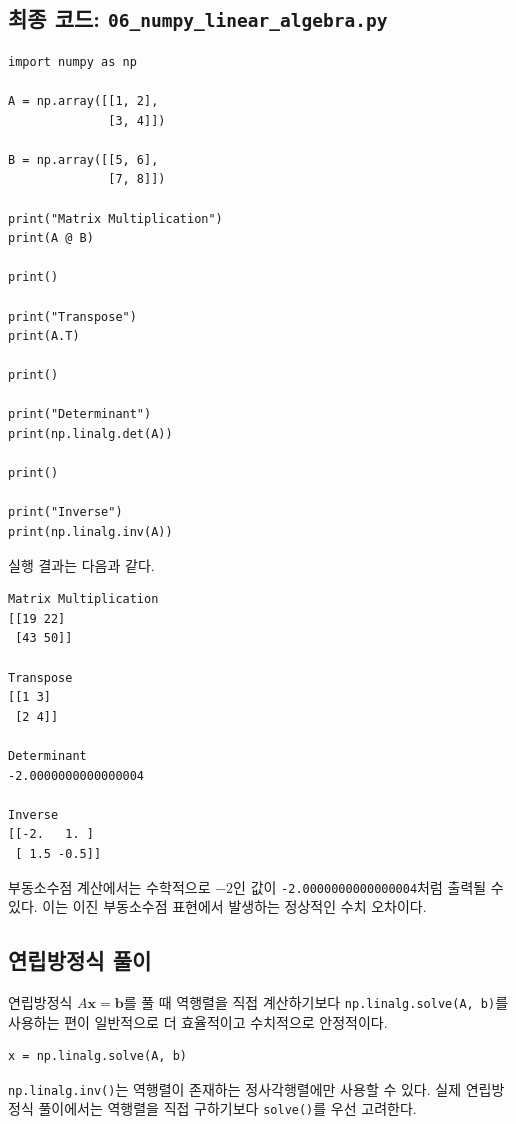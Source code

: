 \documentclass[11pt,a4paper]{article}
\begin{document}
\subsection{최종 코드: \texttt{06\_numpy\_linear\_algebra.py}}

\begin{lstlisting}
import numpy as np

A = np.array([[1, 2],
              [3, 4]])

B = np.array([[5, 6],
              [7, 8]])

print("Matrix Multiplication")
print(A @ B)

print()

print("Transpose")
print(A.T)

print()

print("Determinant")
print(np.linalg.det(A))

print()

print("Inverse")
print(np.linalg.inv(A))
\end{lstlisting}

실행 결과는 다음과 같다.

\begin{verbatim}
Matrix Multiplication
[[19 22]
 [43 50]]

Transpose
[[1 3]
 [2 4]]

Determinant
-2.0000000000000004

Inverse
[[-2.   1. ]
 [ 1.5 -0.5]]
\end{verbatim}

부동소수점 계산에서는 수학적으로 $-2$인 값이 \texttt{-2.0000000000000004}처럼 출력될 수 있다. 이는 이진 부동소수점 표현에서 발생하는 정상적인 수치 오차이다.

\subsection{연립방정식 풀이}

연립방정식 $A\mathbf{x}=\mathbf{b}$를 풀 때 역행렬을 직접 계산하기보다 \texttt{np.linalg.solve(A, b)}를 사용하는 편이 일반적으로 더 효율적이고 수치적으로 안정적이다.

\begin{lstlisting}
x = np.linalg.solve(A, b)
\end{lstlisting}

\begin{importantbox}
\texttt{np.linalg.inv()}는 역행렬이 존재하는 정사각행렬에만 사용할 수 있다. 실제 연립방정식 풀이에서는 역행렬을 직접 구하기보다 \texttt{solve()}를 우선 고려한다.
\end{importantbox}
\end{document}
